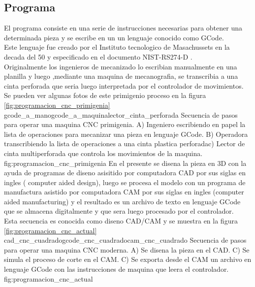 \subsection{Programa}
   El programa consiste en una serie de instrucciones necesarias para obtener una determinada pieza y se escribe en un un lenguaje conocido como GCode\citep{WEBSITE:gcode_wiki}.  \\
   Este lenguaje fue creado por el Instituto tecnologico de Masachussets en la decada del 50 y especificado en el documento NIST-RS274-D \citep{rs274}.  \\
Originalmente los ingenieros de mecanizado lo escribian manualmente en una planilla y luego ,mediante una maquina de mecanografia, se transcribia a una cinta perforada que seria luego interpretada por el controlador de movimientos.\\
Se pueden ver algunas fotos de este primigenio proceso en la figura \ref{fig:programacion_cnc_primigenia}
          {gcode_a_mano}{gcode_a_maquina}{lector_cinta_perforada}
          {Secuencia de pasos para operar una maquina CNC primigenia. A) Ingeniero escribiendo en papel la lista de operaciones para mecanizar una pieza en lenguaje GCode. B) Operadora transcribiendo la lista de operaciones a una cinta plastica perforadac) Lector de cinta multiperforada que controla los movimientos de la maquina.}
          {fig:programacion_cnc_primigenia}
          En el presente se disena la pieza en 3D con la ayuda de programas de diseno asisitido por computadora CAD por sus siglas en ingles ( computer aided design), luego se procesa el modelo con un programa de manufactura asistido por computadora CAM por sus siglas en ingles (computer aided manufacturing) y el resultado es un archivo de texto en lenguaje GCode que se almacena digitalmente y que sera luego procesado por el controlador. \\
          Esta secuencia es conocida como diseno CAD/CAM y se muestra en la figura \ref{fig:programacion_cnc_actual}
          {cad_cnc_cuadrado}{gcode_cnc_cuadrado}{cam_cnc_cuadrado}
          {Secuencia de pasos para operar una maquina CNC moderna. A) Se disena la pieza en el CAD. C) Se simula el proceso de corte en el CAM. C) Se exporta desde el CAM un archivo en lenguaje GCode con las instrucciones de maquina que leera el controlador.}
          {fig:programacion_cnc_actual}


